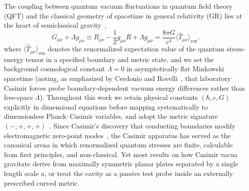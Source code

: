 \documentclass[aps,prd,twocolumn,10pt,showkeys,nofootinbib,floatfix,longbibliography]{revtex4-2}
\begin{document}
The coupling between quantum vacuum fluctuations in quantum field theory (QFT) and the classical geometry of spacetime in general relativity (GR) lies at the heart of semiclassical gravity~\cite{birrell1982,wald1984},
\begin{equation}
G_{\mu\nu} + \Lambda g_{\mu\nu} \equiv R_{\mu\nu} - \frac{1}{2} g_{\mu\nu} R + \Lambda g_{\mu\nu} = \frac{8\pi G}{c^4} \langle \hat{T}_{\mu\nu} \rangle_{\mathrm{ren}},
\label{eq:semiclassical_einstein}
\end{equation}
where $\langle \hat{T}_{\mu\nu} \rangle_{\mathrm{ren}}$ denotes the renormalized expectation value of the quantum stress-energy tensor in a specified boundary and metric state, and we set the background cosmological constant $\Lambda = 0$ in asymptotically flat Minkowski spacetime (noting, as emphasized by Cerdonio and Rovelli~\cite{cerdonio2015ijmpd}, that laboratory Casimir forces probe boundary-dependent vacuum energy differences rather than free-space $\Lambda$). Throughout this work we retain physical constants $(\hbar, c, G)$ explicitly in dimensional equations before mapping systematically to dimensionless Planck--Casimir variables, and adopt the metric signature $(-,+,+,+)$~\cite{misner1973,wald1984}. Since Casimir's discovery that conducting boundaries modify electromagnetic zero-point modes~\cite{casimir1948,bordag2009}, the Casimir apparatus has served as the canonical arena in which renormalized quantum stresses are finite, calculable from first principles, and non-classical. Yet most results on how Casimir vacua gravitate derive from maximally symmetric planar plates separated by a single length scale $a$, or treat the cavity as a passive test probe inside an externally prescribed curved metric.
\end{document}
